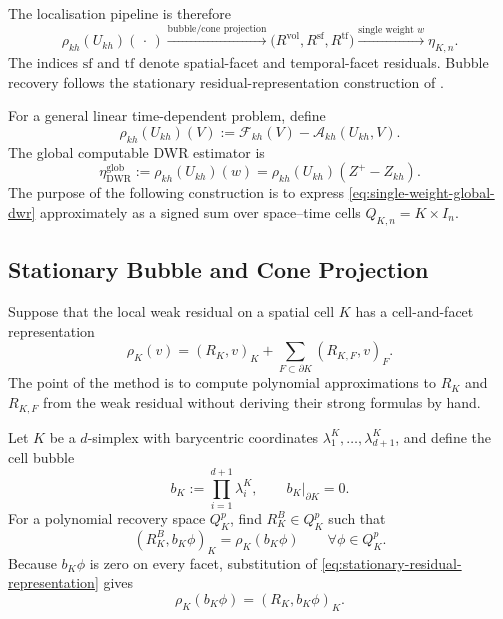 \documentclass[11pt,a4paper]{article}
\begin{document}
The localisation pipeline is therefore
\begin{equation}
 \boxed{
 \rho_{kh}(U_{kh})(\,\cdot\,)
 \xrightarrow{\text{bubble/cone projection}}
 \bigl(R^{\mathrm{vol}},R^{\mathrm{sf}},R^{\mathrm{tf}}\bigr)
 \xrightarrow{\text{single weight }w}
 \eta_{K,n}.}
 \label{eq:single-weight-bubble-pipeline}
\end{equation}
The indices \(\mathrm{sf}\) and \(\mathrm{tf}\) denote spatial-facet and temporal-facet residuals. Bubble recovery follows the stationary residual-representation construction of \citet{RognesLogg2013}.

For a general linear time-dependent problem, define
\begin{equation}
 \rho_{kh}(U_{kh})(V)
 :=
 \mathcal F_{kh}(V)-\mathcal A_{kh}(U_{kh},V).
 \label{eq:weak-residual-recovery}
\end{equation}
The global computable DWR estimator is
\begin{equation}
 \eta_{\mathrm{DWR}}^{\mathrm{glob}}
 :=
 \rho_{kh}(U_{kh})(w)
 =
 \rho_{kh}(U_{kh})(Z^{+}-Z_{kh}).
 \label{eq:single-weight-global-dwr}
\end{equation}
The purpose of the following construction is to express \cref{eq:single-weight-global-dwr} approximately as a signed sum over space--time cells \(Q_{K,n}=K\times I_n\).


\subsection{Stationary Bubble and Cone Projection}
\label{sec:stationary-residual-recovery}

Suppose that the local weak residual on a spatial cell \(K\) has a cell-and-facet representation
\begin{equation}
 \rho_K(v)
 =
 (R_K,v)_K
 +
 \sum_{F\subset\partial K}(R_{K,F},v)_F .
 \label{eq:stationary-residual-representation}
\end{equation}
The point of the method is to compute polynomial approximations to \(R_K\) and \(R_{K,F}\) from the weak residual without deriving their strong formulas by hand.

Let \(K\) be a \(d\)-simplex with barycentric coordinates \(\lambda_1^K,\ldots,\lambda_{d+1}^K\), and define the cell bubble
\begin{equation}
 b_K:=\prod_{i=1}^{d+1}\lambda_i^K,
 \qquad b_K|_{\partial K}=0.
 \label{eq:recovery-cell-bubble}
\end{equation}
For a polynomial recovery space \(Q_K^p\), find \(R_K^B\in Q_K^p\) such that
\begin{equation}
 \boxed{
 (R_K^B,b_K\phi)_K
 =
 \rho_K(b_K\phi)
 \qquad\forall\phi\in Q_K^p.}
 \label{eq:stationary-cell-projection}
\end{equation}
Because \(b_K\phi\) is zero on every facet, substitution of \cref{eq:stationary-residual-representation} gives
\[
 \rho_K(b_K\phi)=(R_K,b_K\phi)_K.
\]
\end{document}
